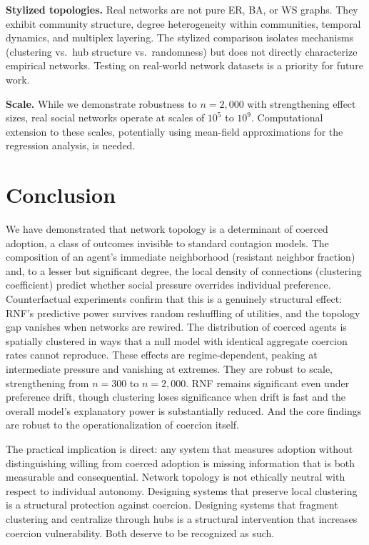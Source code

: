 \documentclass[11pt, a4paper]{article}
\begin{document}
\textbf{Stylized topologies.} Real networks are not pure ER, BA, or WS graphs. They exhibit community structure, degree heterogeneity within communities, temporal dynamics, and multiplex layering. The stylized comparison isolates mechanisms (clustering vs.\ hub structure vs.\ randomness) but does not directly characterize empirical networks. Testing on real-world network datasets is a priority for future work.

\textbf{Scale.} While we demonstrate robustness to $n = 2{,}000$ with strengthening effect sizes, real social networks operate at scales of $10^5$ to $10^9$. Computational extension to these scales, potentially using mean-field approximations for the regression analysis, is needed.

\section{Conclusion}
\label{sec:conclusion}

We have demonstrated that network topology is a determinant of coerced adoption, a class of outcomes invisible to standard contagion models. The composition of an agent's immediate neighborhood (resistant neighbor fraction) and, to a lesser but significant degree, the local density of connections (clustering coefficient) predict whether social pressure overrides individual preference. Counterfactual experiments confirm that this is a genuinely structural effect: RNF's predictive power survives random reshuffling of utilities, and the topology gap vanishes when networks are rewired. The distribution of coerced agents is spatially clustered in ways that a null model with identical aggregate coercion rates cannot reproduce. These effects are regime-dependent, peaking at intermediate pressure and vanishing at extremes. They are robust to scale, strengthening from $n = 300$ to $n = 2{,}000$. RNF remains significant even under preference drift, though clustering loses significance when drift is fast and the overall model's explanatory power is substantially reduced. And the core findings are robust to the operationalization of coercion itself.

The practical implication is direct: any system that measures adoption without distinguishing willing from coerced adoption is missing information that is both measurable and consequential. Network topology is not ethically neutral with respect to individual autonomy. Designing systems that preserve local clustering is a structural protection against coercion. Designing systems that fragment clustering and centralize through hubs is a structural intervention that increases coercion vulnerability. Both deserve to be recognized as such.
\end{document}
